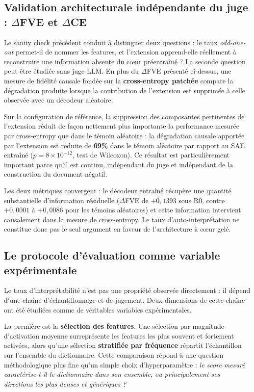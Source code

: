 \documentclass[11pt]{article}
\begin{document}
\subsection{Validation architecturale indépendante du juge : $\Delta$FVE et $\Delta$CE}
\label{subsec:delta-ce}

Le sanity check précédent conduit à distinguer deux questions : le taux
\emph{odd-one-out} permet-il de nommer les features, et l'extension apprend-elle
réellement à reconstruire une information absente du cœur préentraîné ? La seconde
question peut être étudiée sans juge LLM. En plus du $\Delta$FVE présenté ci-dessus,
une mesure de fidélité causale fondée sur la \textbf{cross-entropy patchée} compare la
dégradation produite lorsque la contribution de l'extension est supprimée à celle
observée avec un décodeur aléatoire.

Sur la configuration de référence, la suppression des composantes pertinentes de
l'extension réduit de façon nettement plus importante la performance mesurée par
cross-entropy que dans le témoin aléatoire : la dégradation causale apportée par
l'extension est réduite de \textbf{69\%} dans le témoin aléatoire par rapport au SAE
entraîné ($p=8\times10^{-12}$, test de Wilcoxon). Ce résultat est particulièrement
important parce qu'il est continu, indépendant du juge et indépendant de la
construction du document négatif.

\begin{resultbox}
Les deux métriques convergent : le décodeur entraîné récupère une quantité substantielle
d'information résiduelle ($\Delta$FVE de $+0{,}1393$ sous R0, contre $+0{,}0001$ à
$+0{,}0086$ pour les témoins aléatoires) et cette information intervient causalement
dans la mesure de cross-entropy. Le taux d'auto-interprétation ne constitue donc pas
le seul argument en faveur de l'architecture à cœur gelé.
\end{resultbox}

\subsection{Le protocole d'évaluation comme variable expérimentale}
\label{subsec:correction-methode}

Le taux d'interprétabilité n'est pas une propriété observée directement : il dépend
d'une chaîne d'échantillonnage et de jugement. Deux dimensions de cette chaîne ont
été étudiées comme de véritables variables expérimentales.

La première est la \textbf{sélection des features}. Une sélection par magnitude
d'activation moyenne surreprésente les features les plus souvent et fortement
activées, alors qu'une sélection \textbf{stratifiée par fréquence} répartit
l'échantillon sur l'ensemble du dictionnaire. Cette comparaison répond à une question
méthodologique plus fine qu'un simple choix d'hyperparamètre : \emph{le score mesuré
caractérise-t-il le dictionnaire dans son ensemble, ou principalement ses directions
les plus denses et génériques ?}
\end{document}

